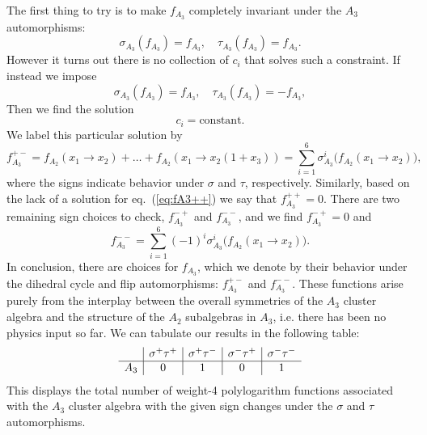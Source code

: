 \documentclass[12pt]{article}
\begin{document}
The first thing to try is to make $f_{A_3}$ completely invariant under the $A_3$ automorphisms:
\begin{equation}\label{eq:fA3++}
	\sigma_{A_3}(f_{A_3}) = f_{A_3},\quad \tau_{A_3}(f_{A_3}) = f_{A_3}.  
\end{equation}
However it turns out there is no collection of $c_i$ that solves such a constraint. If instead we impose 
\begin{equation}
	\sigma_{A_3}(f_{A_3}) = f_{A_3},\quad \tau_{A_3}(f_{A_3}) = -f_{A_3},
\end{equation}
Then we find the solution 
\begin{equation}
	c_i = \text{constant}.
\end{equation}
We label this particular solution by 
\begin{equation}
	f_{A_3}^{+-} = f_{A_2}(x_1 \to x_2) + \ldots + f_{A_2}(x_1\to x_2 \left(1+x_3\right)) = \sum_{i=1}^6 \sigma_{A_3}^i\big(f_{A_2}(x_1\to x_2)\big),
\end{equation}
where the signs indicate behavior under $\sigma$ and $\tau$, respectively. Similarly, based on the lack of a solution for eq.~(\ref{eq:fA3++}) we say that $f_{A_3}^{++} = 0$. There are two remaining sign choices to check, $f_{A_3}^{-+}$ and $f_{A_3}^{--}$, and we find $f_{A_3}^{-+} = 0$ and		
\begin{equation}
	f_{A_3}^{--} =\sum_{i=1}^6(-1)^i\sigma_{A_3}^i \big(f_{A_2}(x_1\to x_2)\big).
\end{equation}
In conclusion, there are choices for $f_{A_3}$, which we denote by their behavior under the dihedral cycle and flip automorphisms: $f_{A_3}^{+-}$ and $f_{A_3}^{--}$. These functions arise purely from the interplay between the overall symmetries of the $A_3$ cluster algebra and the structure of the $A_2$ subalgebras in $A_3$, i.e. there has been no physics input so far. We can tabulate our results in the following table:
\begin{equation}\label{eq:a3-func-counts}
\begin{array}{ l | c | c | c | c }			
  & \sigma^+\tau^+ & \sigma^+\tau^- & \sigma^-\tau^+ & \sigma^-\tau^- \\
  \hline
  A_3 & 0 & 1 & 0 & 1 \\  
\end{array} 
\end{equation}
This displays the total number of weight-4 polylogarithm functions associated with the $A_3$ cluster algebra with the given sign changes under the $\sigma$ and $\tau$ automorphisms. 
\end{document}
